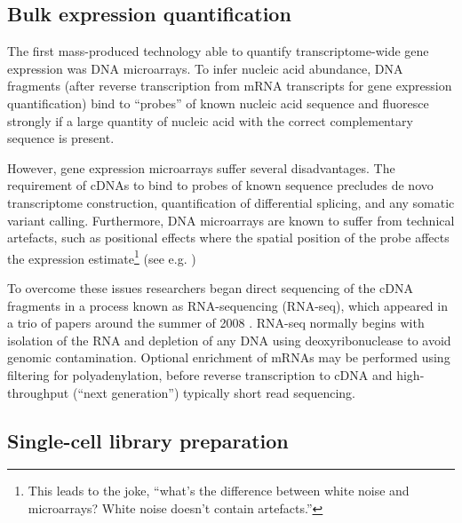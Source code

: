 \subsection{Bulk expression quantification}




The first mass-produced technology able to quantify transcriptome-wide gene expression was DNA microarrays. To infer nucleic acid abundance, DNA fragments (after reverse transcription from mRNA transcripts for gene expression quantification) bind to ``probes'' of known nucleic acid sequence and fluoresce strongly if a large quantity of nucleic acid with the correct complementary sequence is present.

However, gene expression microarrays suffer several disadvantages. The requirement of cDNAs to bind to probes of known sequence precludes de novo transcriptome construction, quantification of differential splicing, and any somatic variant calling. Furthermore, DNA microarrays are known to suffer from technical artefacts, such as positional effects where the spatial position of the probe affects the expression estimate\footnote{
This leads to the joke, ``what's the difference between white noise and microarrays? White noise doesn't contain artefacts.''
} (see e.g. \cite{petri2012detection,yu2006positional})

To overcome these issues researchers began direct sequencing of the cDNA fragments in a process known as RNA-sequencing (RNA-seq), which appeared in a trio of papers around the summer of 2008 \cite{mortazavi2008mapping,nagalakshmi2008transcriptional,lister2008highly}. RNA-seq normally begins with isolation of the RNA and depletion of any DNA using deoxyribonuclease to avoid genomic contamination. Optional enrichment of mRNAs may be performed using filtering for polyadenylation, before reverse transcription to cDNA and high-throughput (``next generation'') typically short read sequencing.


\subsection{Single-cell library preparation} \label{sec:sc_lib_prep}

